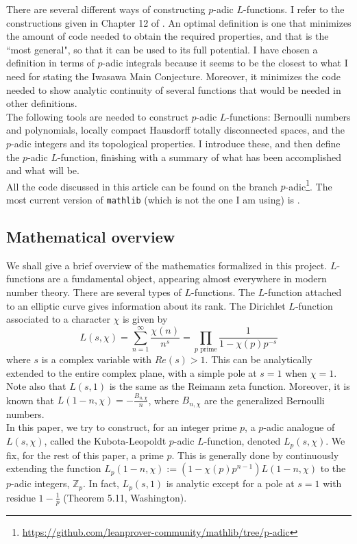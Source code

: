 \documentclass[11pt]{article}
\begin{document}
There are several different ways of constructing $p$-adic $L$-functions. I refer to the constructions
given in Chapter 12 of \cite{cyc}. An optimal definition is one that minimizes the amount of code needed 
to obtain the required properties, and that is the ``most general", so that it can be used to its full 
potential. I have chosen a definition in terms of $p$-adic integrals because it seems to be the
closest to what I need for stating the Iwasawa Main Conjecture. Moreover, it minimizes the
code needed to show analytic continuity of several functions that would be needed in other definitions. \\

The following tools are needed to construct $p$-adic $L$-functions: Bernoulli numbers and polynomials, locally compact Hausdorff totally
disconnected spaces, and the $p$-adic integers and its topological properties.
I introduce these, and then define the $p$-adic $L$-function, finishing with a summary of what has been
accomplished and what will be. \\

All the code discussed in this article can be found on the branch $p$-adic\footnote{\url{https://github.com/leanprover-community/mathlib/tree/p-adic}}. 
The most current version of \texttt{mathlib} (which is not the one I am using) is \cite{mathlib}.

\subsection{Mathematical overview}
We shall give a brief overview of the mathematics formalized in this project. 
$L$-functions are a fundamental object, appearing almost everywhere in modern 
number theory. There are several types of $L$-functions. The $L$-function attached 
to an elliptic curve gives information about its rank. The Dirichlet $L$-function 
associated to a character $\chi$ is given by  
$$ L(s, \chi) = \sum_{n = 1}^{\infty} \frac{\chi (n)}{n^s} = \prod_{p \text{ prime}} \frac{1}{1 - \chi (p) p^{-s}}$$
where $s$ is a complex variable with $Re(s) > 1$. This can be analytically extended 
to the entire complex plane, with a simple pole at $s = 1$ when $\chi = 1$. Note also 
that $L(s, 1)$ is the same as the Reimann zeta function. Moreover, it is known that 
$L(1 - n, \chi) = - \frac{B_{n, \chi}}{n}$, where $B_{n, \chi}$ are the generalized 
Bernoulli numbers. \\

In this paper, we try to construct, for an integer prime $p$, a $p$-adic analogue of $L(s, \chi)$, 
called the Kubota-Leopoldt $p$-adic $L$-function, denoted $L_p(s, \chi)$. We fix, for the rest 
of this paper, a prime $p$. This is generally done by continuously extending the function 
$L_p(1 - n, \chi) := (1 - \chi (p) p^{n - 1}) L(1 - n, \chi)$ to the $p$-adic integers, 
$\mathbb{Z}_p$. In fact, $L_p(s, 1)$ is analytic except for a pole at $s = 1$ with residue 
$1 - \frac{1}{p}$ (Theorem 5.11, Washington). \\
\end{document}
